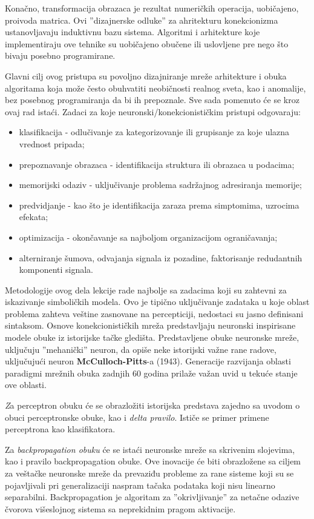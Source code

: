 \documentclass[fontsize=11bp, paper=a4]{scrarticle}
\begin{document}
Konačno, transformacija obrazaca je rezultat numeričkih operacija, uobičajeno, proivoda matrica. Ovi ''dizajnerske odluke'' za ahritekturu konekcionizma ustanovljavaju induktivnu bazu sistema. Algoritmi i arhitekture koje implementiraju ove tehnike su uobičajeno obučene ili uslovljene pre nego što bivaju posebno programirane.

Glavni cilj ovog pristupa su povoljno dizajniranje mreže arhitekture i obuka algoritama koja može često obuhvatiti neobičnosti realnog sveta, kao i anomalije, bez posebnog programiranja da bi ih prepoznale. Sve sada pomenuto će se kroz ovaj rad istaći. 
Zadaci za koje neuronski/konekcionističkim pristupi odgovaraju: 
\begin{itemize}
    \item klasifikacija - odlučivanje za kategorizovanje ili grupisanje za koje ulazna vrednost pripada;
    \item prepoznavanje obrazaca - identifikacija struktura ili obrazaca u podacima;
    \item memorijski odaziv - uključivanje problema sadržajnog adresiranja memorije;
    \item predvidjanje - kao što je identifikacija zaraza prema simptomima, uzrocima efekata;
    \item optimizacija - okončavanje sa najboljom organizacijom ograničavanja;
    \item alterniranje šumova, odvajanja signala iz pozadine, faktorisanje redudantnih komponenti signala.
\end{itemize}
Metodologije ovog dela lekcije rade najbolje sa zadacima koji su zahtevni za iskazivanje simboličkih modela. Ovo je tipično uključivanje zadataka u koje oblast problema zahteva veštine zasnovane na percepticiji, nedostaci su jasno definisani sintaksom.
Osnove konekcionističkih mreža predstavljaju neuronski inspirisane modele obuke iz istorijske tačke gledišta.
Predstavljene obuke neuronske mreže, uključuju ''mehanički'' neuron, da opiše neke istorijski važne rane radove, uključujući neuron \textbf{McCulloch-Pitts}-a (1943). Generacije razvijanja oblasti paradigmi mrežnih obuka zadnjih 60 godina prilaže važan uvid u tekuće stanje ove oblasti.

\textit Za {perceptron obuku} će se obrazložiti istorijska predstava zajedno sa uvodom o obuci perceptronske obuke, kao i \textit{delta pravilo}. Ističe se primer primene perceptrona kao klasifikatora.

Za \textit{backpropagation obuku} će se istaći neuronske mreže sa skrivenim slojevima, kao i pravilo backpropagation obuke. Ove inovacije će biti obrazložene sa ciljem za veštačke neuronske mreže da prevaziđu probleme za rane sisteme koji su se pojavljivali pri generalizaciji naspram tačaka podataka koji nisu linearno separabilni. Backpropagation je algoritam za ''okrivljivanje'' za netačne odazive čvorova višeslojnog sistema sa neprekidnim pragom aktivacije. 
\end{document}
